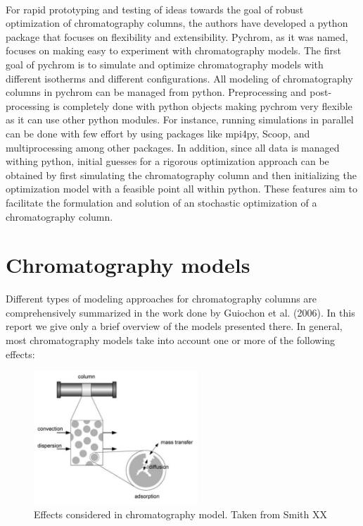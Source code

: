\documentclass[paper=a4, fontsize=11pt]{scrartcl}
\begin{document}
\\
For rapid prototyping and testing of ideas towards the goal of robust optimization of chromatography columns, the authors have developed a python package that focuses on flexibility and extensibility. Pychrom, as it was named, focuses on making easy to experiment with chromatography models. The first goal of pychrom is to simulate and optimize chromatography models with different isotherms and different configurations. All modeling of chromatography columns in pychrom can be managed from python. Preprocessing and post-processing is completely done with python objects making pychrom very flexible as it can use other python modules. For instance, running simulations in parallel can be done with few effort by using packages like mpi4py, Scoop, and multiprocessing among other packages. In addition, since all data is managed withing python, initial guesses for a rigorous optimization approach can be obtained by first simulating the chromatography column and then initializing the optimization model with a feasible point all within python. These features aim to facilitate the formulation and solution of an stochastic optimization of a chromatography column. 
 

\section{Chromatography models}

Different types of modeling approaches for chromatography columns are comprehensively summarized in the work done by Guiochon et al. (2006). In this report we give only a brief overview of the models presented there. In general, most chromatography models take into account one or more of the following effects:

\begin{figure}[h]
\centering
\includegraphics[width=0.55\textwidth]{diagramtransport.png}
\caption{Effects considered in chromatography model. Taken from Smith XX}
\end{figure}
\end{document}
